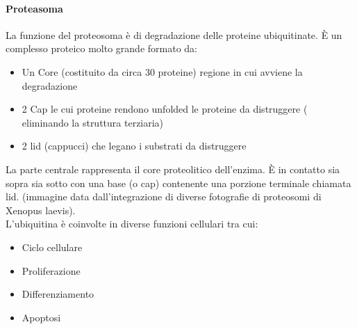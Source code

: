 \documentclass{article}
\begin{document}
\paragraph{Proteasoma}
La funzione del proteosoma è di degradazione delle proteine ubiquitinate. È un complesso proteico molto grande formato da:
\begin{itemize}
    \item Un Core (costituito da circa 30 proteine) regione in cui avviene la degradazione
    \item 2 Cap le cui proteine rendono unfolded le proteine da distruggere ( eliminando la struttura terziaria)
    \item 2 lid (cappucci) che legano i substrati da distruggere
\end{itemize}
La parte centrale rappresenta il core proteolitico dell'enzima. È in contatto sia sopra sia sotto con una base (o cap) contenente una porzione terminale chiamata lid. (immagine data
dall'integrazione di diverse fotografie di proteosomi di Xenopus laevis).\\
L'ubiquitina è coinvolte in diverse funzioni cellulari tra cui:
\begin{itemize}
    \item Ciclo cellulare
    \item Proliferazione
    \item Differenziamento
    \item Apoptosi
\end{itemize}
\end{document}
